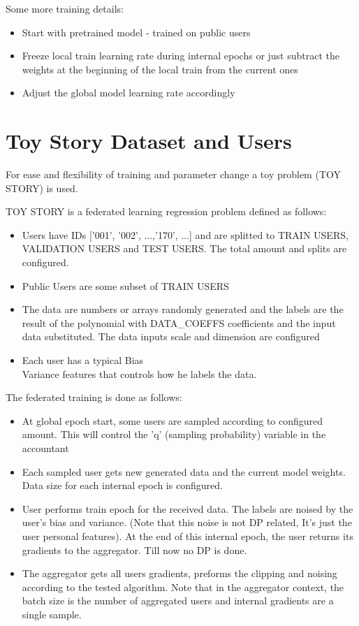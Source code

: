 Some more training details:
\begin{itemize}
    \item Start with pretrained model - trained on public users
    \item Freeze local train learning rate during internal epochs or just subtract the weights at the beginning of the local train from the current ones
    \item Adjust the global model learning rate accordingly
\end{itemize}


\section{Toy Story Dataset and Users}
For ease and flexibility of training and parameter change a toy problem (TOY STORY) is used.

TOY STORY is a federated learning regression problem defined as follows:
\begin{itemize}
    \item Users have IDs ['001', '002', ...,'170', ...] and are splitted to TRAIN USERS, VALIDATION USERS and TEST USERS. The total amount and splits are configured.
    \item Public Users are some subset of TRAIN USERS
    \item The data are numbers or arrays randomly generated and the labels are the result of the polynomial with DATA\_COEFFS coefficients and the input data substituted. The data inputs scale and dimension are configured
    \item Each user has a typical Bias\\Variance features that controls how he labels the data. 
\end{itemize}

The federated training is done as follows:
\begin{itemize}
    \item At global epoch start, some users are sampled according to configured amount. This will control the 'q' (sampling probability) variable in the accountant
    \item Each sampled user gets new generated data and the current model weights. Data size for each internal epoch is configured. 
    \item User performs train epoch for the received data. The labels are noised by the user's bias and variance. (Note that this noise is not DP related,  It's just the user personal features). At the end of this internal epoch, the user returns its gradients to the aggregator. Till now no DP is done.
    \item The aggregator gets all users gradients, preforms the clipping and noising according to the tested algorithm. Note that in the aggregator context, the batch size is the number of aggregated users and internal gradients are a single sample.
    
\end{itemize}
 
